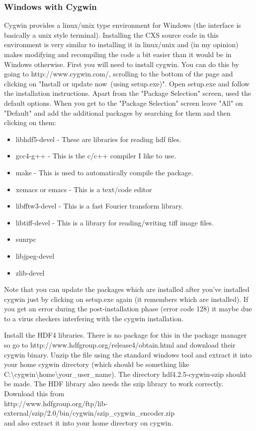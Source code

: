 \documentclass[]{cxs-software}
\begin{document}
\subsubsection{Windows with Cygwin}

Cygwin\cite{} provides a linux/unix type environment for Windows (the
interface is basically a unix style terminal). Installing the CXS
source code in this environment is very similar to installing it in
linux/unix and (in my opinion) makes modifying and recompiling the
code a bit easier than it would be in Windows otherwise. First you
will need to install cygwin. You can do this by going to
http://www.cygwin.com/, scrolling to the bottom of the page and
clicking on "Install or update now\ (using setup.exe)". Open setup.exe
and follow the installation instructions. Apart from the "Package
Selection" screen, used the default options. When you get to the
"Package Selection" screen leave "All" on "Default" and add the
additional packages by searching for them and then clicking on them:
\begin{itemize}
\item libhdf5-devel - These are libraries for reading hdf files.
\item gcc4-g++ - This is the c/c++ compiler I like to use.
\item make - This is used to automatically compile the package.
\item xemacs or emacs - This is a text/code editor
\item libfftw3-devel - This is a fast Fourier transform library.
\item libtiff-devel - This is a library for reading/writing tiff image files.
\item sunrpc
\item libjpeg-devel
\item zlib-devel
\end{itemize}

Note that you can update the packages which are installed after you've
installed cygwin just by clicking on setup.exe again (it remembers
which are installed). If you get an error during the post-installation
phase (error code 128) it maybe due to a virus checkers interfering
with the cygwin installation.

Install the HDF4 libraries. There is no package for this in the
package manager so go to http://www.hdfgroup.org/release4/obtain.html
and download their cygwin binary. Unzip the file using the standard
windows tool and extract it into your home cygwin directory (which
should be something like
C:\textbackslash{}cygwin\textbackslash{}home\textbackslash{}your\_user\_name). The directory
hdf4.2.5-cygwin-szip should be made. The HDF library also needs the
szip library to work correctly. Download this from \\
http://www.hdfgroup.org/ftp/lib-external/szip/2.0/bin/cygwin/szip\_cygwin\_encoder.zip  \\
and also extract it into your home directory on cygwin.
\end{document}
